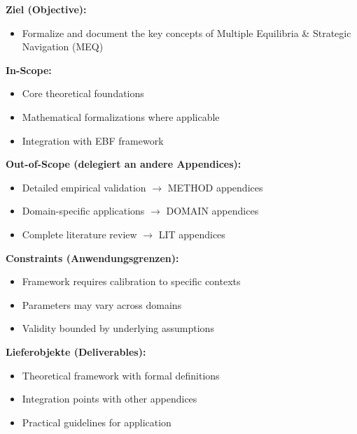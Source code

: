 \begin{tcolorbox}[
    colback=orange!5!white,
    colframe=orange!75!black,
    title={\textbf{Appendix Scope: Ziel / In-Scope / Out-of-Scope / Constraints}},
    fonttitle=\bfseries
]

\textbf{Ziel (Objective):}
\begin{itemize}[nosep]
    \item Formalize and document the key concepts of Multiple Equilibria \& Strategic Navigation (MEQ)
\end{itemize}

\textbf{In-Scope:}
\begin{itemize}[nosep]
    \item Core theoretical foundations
    \item Mathematical formalizations where applicable
    \item Integration with EBF framework
\end{itemize}

\textbf{Out-of-Scope (delegiert an andere Appendices):}
\begin{itemize}[nosep]
    \item Detailed empirical validation $\rightarrow$ METHOD appendices
    \item Domain-specific applications $\rightarrow$ DOMAIN appendices
    \item Complete literature review $\rightarrow$ LIT appendices
\end{itemize}

\textbf{Constraints (Anwendungsgrenzen):}
\begin{itemize}[nosep]
    \item Framework requires calibration to specific contexts
    \item Parameters may vary across domains
    \item Validity bounded by underlying assumptions
\end{itemize}

\textbf{Lieferobjekte (Deliverables):}
\begin{itemize}[nosep]
    \item Theoretical framework with formal definitions
    \item Integration points with other appendices
    \item Practical guidelines for application
\end{itemize}

\end{tcolorbox}



